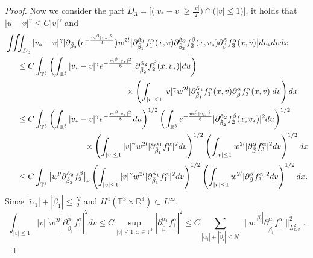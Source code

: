 \documentclass[reqno]{amsart}
\numberwithin{equation}{section}
\numberwithin{equation}{section}
\begin{document}
\begin{proof}
		 Now we consider the part $D_3=\Big[\big(|v_*-v|\geq \frac{|v|}{2}\big)\cap \big(|v|\leq 1\big)\Big]$, it holds that $|u - v|^\gamma \le C|v|^\gamma$ and
		 \begin{align*}
		 	&\iiint_{D_3} |v_* - v|^\gamma | \partial_{\tilde{\beta}_0} \big( e^{-\frac{m^{\beta}|v_*|^2}{4}}\big) w^{2l} \big|\partial_{\tilde{\beta}_1}^{\tilde{\alpha}_1}f^{\alpha}_1 (x,v) \partial_{\tilde{\beta}_2}^{\tilde{\alpha}_2}f^{\beta}_2(x,v_*) \partial_{\tilde{\beta}}^{\tilde{\alpha}}f^{\alpha}_3 (x,v)\big| dv_* dv dx \\
		 	&\hspace{0.5cm}\leq C \int_{\mathbb{T}^3} \left( \int_{\mathbb{R}^3} |v_* - v|^\gamma e^{-\frac{m^{\beta}|v_*|^2}{8}} | \partial_{\tilde{\beta}_2}^{\tilde{\alpha}_2}f^{\beta}_2(x,v_*) | du \right) \\
		 	&\hspace{4.8cm}\quad \times \left( \int_{|v| \le 1} |v|^\gamma w^{2l} |\partial_{\tilde{\beta}_1}^{\tilde{\alpha}_1}f^{\alpha}_1 (x,v)  \partial_{\tilde{\beta}}^{\tilde{\alpha}}f^{\alpha}_3 (x,v) | dv \right) dx \\
		 	&\hspace{0.5cm}\leq C \int_{\mathbb{T}^3} \left( \int_{\mathbb{R}^3} |v_* - v|^\gamma e^{-\frac{m^{\beta}|v_*|^2}{8}} du \right)^{1/2} \left( \int_{\mathbb{R}^3} e^{-\frac{m^{\beta}|v_*|^2}{8}} | \partial_{\tilde{\beta}_2}^{\tilde{\alpha}_2}f^{\beta}_2(x,v_*) |^2 du \right)^{1/2} \\
		 	&\hspace{3.4cm} \times \left( \int_{|v| \le 1} |v|^\gamma w^{2l} | \partial_{\tilde{\beta}_1}^{\tilde{\alpha}_1}f^{\alpha}_1 |^2 dv \right)^{1/2} \left( \int_{|v| \le 1} w^{2l} | \partial_{\tilde{\beta}}^{\tilde{\alpha}}f^{\alpha}_3 |^2 dv \right)^{1/2} dx \\
		 	&\hspace{0.5cm}\leq C \int_{\mathbb{T}^3} \big| w^\theta \partial_{\tilde{\beta}_2}^{\tilde{\alpha}_2}f^{\beta}_2 \big|_{\nu} \left( \int_{|v| \le 1} |v|^\gamma w^{2l} | \partial_{\tilde{\beta}_1}^{\tilde{\alpha}_1}f^{\alpha}_1 |^2 dv \right)^{1/2} \left( \int_{|v| \le 1} w^{2l} | \partial_{\tilde{\beta}}^{\tilde{\alpha}}f^{\alpha}_3 |^2 dv \right)^{1/2} dx.
		 \end{align*}
		 Since $|\tilde{\alpha}_1| + |\tilde{\beta}_1| \leq \frac{N}{2}$ and $H^4(\mathbb{T}^3 \times \mathbb{R}^3) \subset L^\infty$,
		 $$
		 \int_{|v| \le 1} |v|^\gamma w^{2l} | \partial_{\tilde{\beta}_1}^{\tilde{\alpha}_1}f^{\alpha}_1 |^2 dv \le C \sup_{|v| \le 1, x \in \mathbb{T}^3} | \partial_{\tilde{\beta}_1}^{\tilde{\alpha}_1}f^{\alpha}_1 |^2 \le C \sum_{|\tilde{\alpha}_i| + |\tilde{\beta}_i| \le N} \big\| w^{|\tilde{\beta}_i|}  \partial_{\tilde{\beta}_i}^{\tilde{\alpha}_i}f^{\alpha}_1  \big\|_{L^{2}_{x,v}}^2.
$$
\end{proof}
\end{document}
